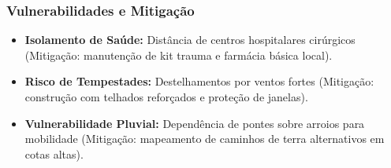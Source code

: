\subsubsection{Vulnerabilidades e
Mitigação}

\begin{itemize}
\tightlist
\item
  \textbf{Isolamento de Saúde:} Distância de centros hospitalares
  cirúrgicos (Mitigação: manutenção de kit trauma e farmácia básica
  local).
\item
  \textbf{Risco de Tempestades:} Destelhamentos por ventos fortes
  (Mitigação: construção com telhados reforçados e proteção de janelas).
\item
  \textbf{Vulnerabilidade Pluvial:} Dependência de pontes sobre arroios
  para mobilidade (Mitigação: mapeamento de caminhos de terra
  alternativos em cotas altas).
\end{itemize}

